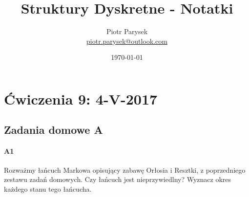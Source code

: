 \documentclass[a4paper,12pt]{article}
\title{Struktury Dyskretne - Notatki}
\author{Piotr Parysek\\
\href{mailto:piotr.parysek@outlook.com}{piotr.parysek@outlook.com} }
\date{\today}
\theoremstyle{definition}%
\theoremstyle{definition}
\theoremstyle{problem}
\begin{document}
\maketitle

\tableofcontents
\section{Ćwiczenia 9: 4-V-2017}
\subsection{Zadania domowe A}
\paragraph{A1} Rozważmy łańcuch Markowa opisujący zabawę Orłosia i Resztki, z poprzedniego zestawu zadań domowych. Czy łańcuch jest nieprzywiedlny? Wyznacz okres każdego stanu tego łańcucha.
\end{document}
